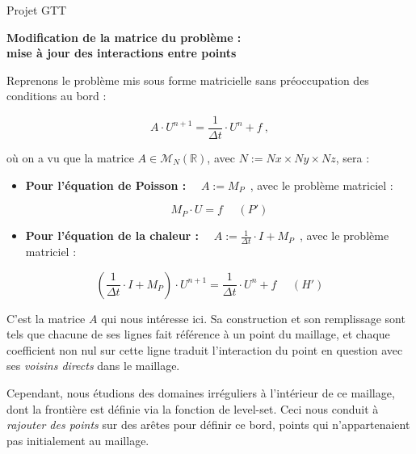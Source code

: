 \documentclass[12pt]{article}
\def \RR {\mathbb{R}}
\def \sM {\mathcal{M}}
\def \disp {\displaystyle}
\begin{document}
{\large
{}
\hfill {\sc Projet GTT} \\
}
\vspace{10 mm}
\begin{center}
	\Large{\textbf{Modification de la matrice du problème :}} \\
	\Large{\textbf{mise à jour des interactions entre points}}
\end{center}

\vspace{10 mm}

\noindent
Reprenons le problème mis sous forme matricielle sans préoccupation des conditions au bord :

$$A \cdot U^{n+1} = \frac{1}{\Delta t} \cdot U^n + f~,$$

\vspace{5 mm}

\noindent
où on a vu que la matrice $A \in \sM_N (\RR)$, avec $N := Nx \times Ny \times Nz$, sera :

\vspace{5 mm}

\begin{itemize}
	\item \textbf{Pour l'équation de Poisson :}~~ $A := M_P$~, avec le problème matriciel :

$$M_P \cdot U = f~~~~~~(P')$$

\vspace{5 mm}

	\item \textbf{Pour l'équation de la chaleur :}~~ $\disp A := \frac{1}{\Delta t} \cdot I + M_P$~, avec le problème matriciel :
\end{itemize}

$$\left( \frac{1}{\Delta t} \cdot I + M_P \right) \cdot U^{n+1} = \frac{1}{\Delta t} \cdot U^n + f~~~~~~(H')$$

\vspace{5 mm}

\noindent
C'est la matrice $A$ qui nous intéresse ici. Sa construction et son remplissage sont tels que chacune de ses lignes fait référence à un point du maillage, et chaque coefficient non nul sur cette ligne traduit l'interaction du point en question avec ses \textit{voisins directs} dans le maillage.

\vspace{5 mm}

\noindent
Cependant, nous étudions des domaines irréguliers à l'intérieur de ce maillage, dont la frontière est définie via la fonction de level-set. Ceci nous conduit à \textit{rajouter des points} sur des arêtes pour définir ce bord, points qui n'appartenaient pas initialement au maillage.
\end{document}
